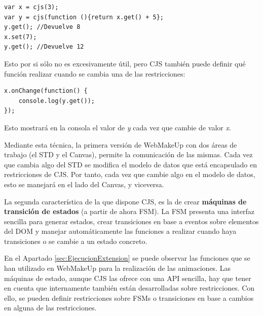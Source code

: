 \begin{verbatim}
var x = cjs(3);
var y = cjs(function (){return x.get() + 5};
y.get(); //Devuelve 8
x.set(7);
y.get(); //Devuelve 12
\end{verbatim}

Esto por si sólo no es excesivamente útil, pero CJS también puede definir qué función realizar cuando se cambia una de las restricciones:

\begin{verbatim}
x.onChange(function() {
    console.log(y.get());
});
\end{verbatim}

Esto mostrará en la consola el valor de \emph{y} cada vez que cambie de valor \emph{x}.

Mediante esta técnica, la primera versión de WebMakeUp con dos áreas de trabajo (el STD y el Canvas), permite la comunicación de las mismas. Cada vez que cambia algo del STD se modifica el modelo de datos que está encapsulado en restricciones de CJS. Por tanto, cada vez que cambie algo en el modelo de datos, esto se manejará en el lado del Canvas, y viceversa.

La segunda característica de la que dispone CJS, es la de crear \textbf{máquinas de transición de estados} (a partir de ahora FSM). La FSM presenta una interfaz sencilla para generar estados, crear transiciones en base a eventos sobre elementos del DOM y manejar automáticamente las funciones a realizar cuando haya transiciones o se cambie a un estado concreto.

En el Apartado \ref{sec:EjecucionExtension} se puede observar las funciones que se han utilizado en WebMakeUp para la realización de las animaciones. Las máquinas de estado, aunque CJS las ofrece con una API sencilla, hay que tener en cuenta que internamente también están desarrolladas sobre restricciones. Con ello, se pueden definir restricciones sobre FSMs o transiciones en base a cambios en alguna de las restricciones.






























